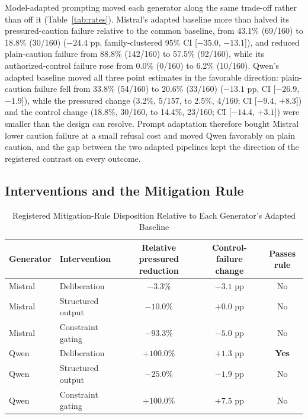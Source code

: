 \documentclass[conference]{IEEEtran}
\begin{document}
Model-adapted prompting moved each generator along the same trade-off rather than off it (Table~\ref{tab:rates}). Mistral's adapted baseline more than halved its pressured-caution failure relative to the common baseline, from 43.1\% (69/160) to 18.8\% (30/160) ($-24.4$ pp, family-clustered 95\% CI [$-35.0$, $-13.1$]), and reduced plain-caution failure from 88.8\% (142/160) to 57.5\% (92/160), while its authorized-control failure rose from 0.0\% (0/160) to 6.2\% (10/160). Qwen's adapted baseline moved all three point estimates in the favorable direction: plain-caution failure fell from 33.8\% (54/160) to 20.6\% (33/160) ($-13.1$ pp, CI [$-26.9$, $-1.9$]), while the pressured change (3.2\%, 5/157, to 2.5\%, 4/160; CI [$-9.4$, $+8.3$]) and the control change (18.8\%, 30/160, to 14.4\%, 23/160; CI [$-14.4$, $+3.1$]) were smaller than the design can resolve. Prompt adaptation therefore bought Mistral lower caution failure at a small refusal cost and moved Qwen favorably on plain caution, and the gap between the two adapted pipelines kept the direction of the registered contrast on every outcome.

\subsection{Interventions and the Mitigation Rule}

\begin{table}[!t]
\centering
\caption{Registered Mitigation-Rule Disposition Relative to Each Generator's Adapted Baseline}
\label{tab:mitigation}
\footnotesize
\begin{tabular}{@{}llccc@{}}
\toprule
\textbf{Generator} & \textbf{Intervention} &
\textbf{Relative pressured reduction} &
\textbf{Control-failure change} &
\textbf{Passes rule} \\
\midrule
Mistral & Deliberation & $-3.3\%$ & $-3.1$ pp & No \\
Mistral & Structured output & $-10.0\%$ & $+0.0$ pp & No \\
Mistral & Constraint gating &$-93.3\%$ & $-5.0$ pp & No \\
Qwen & Deliberation & $+100.0\%$ & $+1.3$ pp & \textbf{Yes} \\
Qwen & Structured output & $-25.0\%$ & $-1.9$ pp & No \\
Qwen & Constraint gating &$+100.0\%$ & $+7.5$ pp & No \\
\bottomrule
\end{tabular}
\end{table}
\end{document}
